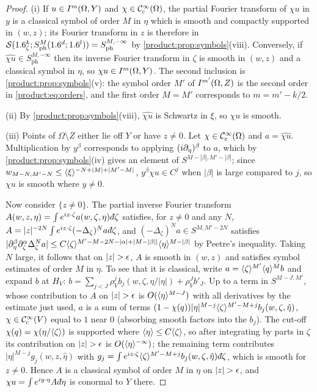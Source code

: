 \begin{proof}
(i) If $u\in I^{m}(\Omega,Y)$ and $\chi\in\mathcal{C}^\infty_{\mathrm{c}}(\Omega)$, the partial Fourier
transform of $\chi u$ in $y$ is a classical symbol of order $M$ in $\eta$ which is
smooth and compactly supported in $(w,z)$; its Fourier transform in $z$ is
therefore in $\mathcal{S}(1.6^k_\zeta;S^{M}_{\mathrm{ph}}(1.6^d;1.6^l))=S^{M,-\infty}_{\mathrm{ph}}$ by
\cref{product:prop:symbols}(viii). Conversely, if $\widehat{\chi u}\in
S^{M,-\infty}_{\mathrm{ph}}$ then its inverse Fourier transform in $\zeta$ is
smooth in $(w,z)$ and a classical symbol in $\eta$, so $\chi u\in I^{m}(\Omega,Y)$.
The second inclusion is \cref{product:prop:symbols}(v): the symbol order $M'$ of
$I^{m'}(\Omega,Z)$ is the second order in \eqref{product:eq:orders}, and the first
order $M=M'$ corresponds to $m=m'-k/2$.

(ii) By \cref{product:prop:symbols}(viii), $\widehat{\chi u}$ is Schwartz in
$\xi$, so $\chi u$ is smooth.

(iii) Points of $\Omega\setminus Z$ either lie off $Y$ or have $z\ne0$. Let
$\chi\in\mathcal{C}^\infty_{\mathrm{c}}(\Omega)$ and $a=\widehat{\chi u}$. Multiplication by
$y^\beta$ corresponds to applying $(i\partial_\eta)^\beta$ to $a$, which by
\cref{product:prop:symbols}(iv) gives an element of $S^{M-|\beta|,M'-|\beta|}$;
since $w_{M-N,M'-N}\le\langle \xi\rangle^{-N+|M|+|M'-M|}$, $y^\beta\chi u\in C^j$ when
$|\beta|$ is large compared to $j$, so $\chi u$ is smooth where $y\ne0$.

Now consider $\{z\ne0\}$. The partial inverse Fourier transform
$A(w,z,\eta)=\int e^{iz\cdot\zeta}a(w,\zeta,\eta)\,\dbar\zeta$ satisfies, for $z\ne0$
and any $N$, $A=|z|^{-2N}\int e^{iz\cdot\zeta}(-\Delta_\zeta)^Na\,\dbar\zeta$, and
$(-\Delta_\zeta)^Na\in S^{M,M'-2N}$ satisfies
$|\partial_\eta^\beta\partial_\zeta^\alpha\Delta^N_\zeta a|\le C\langle \zeta\rangle^{M'-M-2N-|\alpha|+|M-|\beta||}
\langle \eta\rangle^{M-|\beta|}$ by Peetre's inequality. Taking $N$ large, it follows that
on $|z|>\eps$, $A$ is smooth in $(w,z)$ and satisfies symbol estimates of order
$M$ in $\eta$. To see that it is classical, write $a=\langle \zeta\rangle^{M'}\langle q\rangle^Mb$ and
expand $b$ at $H_V$: $b=\sum_{j<J}\rho_V^jb_j(w,\zeta,\eta/|\eta|)+\rho_V^Jb'_J$. Up to a
term in $S^{M-J,M'}$, whose contribution to $A$ on $|z|>\eps$ is
$O(\langle \eta\rangle^{M-J})$ with all derivatives by the estimate just used, $a$ is a sum of
terms $(1-\chi(q))|\eta|^{M-j}\langle \zeta\rangle^{M'-M+j}b_j(w,\zeta,\hat\eta)$, $\chi\in\mathcal{C}^\infty_{\mathrm{c}}(V)$
equal to $1$ near $0$ (absorbing smooth factors into the $b_j$). The cut-off
$\chi(q)=\chi(\eta/\langle \zeta\rangle)$ is supported where $\langle \eta\rangle\le C\langle \zeta\rangle$, so after
integrating by parts in $\zeta$ its contribution on $|z|>\eps$ is
$O(\langle \eta\rangle^{-\infty})$; the remaining term contributes
$|\eta|^{M-j}g_j(w,z,\hat\eta)$ with
$g_j=\int e^{iz\cdot\zeta}\ang\zeta^{M'-M+j}b_j(w,\zeta,\hat\eta)\,\dbar\zeta$, which is
smooth for $z\ne0$. Hence $A$ is a classical symbol of order $M$ in $\eta$ on
$|z|>\eps$, and $\chi u=\int e^{iy\cdot\eta}A\,\dbar\eta$ is conormal to $Y$ there.


\end{proof}
